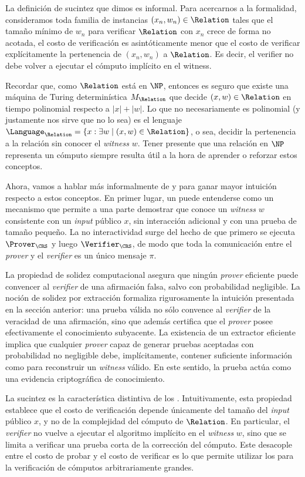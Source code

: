 La definición de sucintez que dimos es informal. Para acercarnos a la formalidad, consideramos toda familia de instancias $(x_n,w_n) \in \Relation$ tales que el tamaño mínimo de $w_n$ para verificar $\Relation$ con $x_n$ crece de forma no acotada, el costo de verificación es asintóticamente menor que el costo de verificar explícitamente la pertenencia de $(x_n, w_n)$ a $\Relation$. Es decir, el verifier no debe volver a ejecutar el cómputo implícito en el witness.

Recordar que, como $\Relation$ está en $\NP$, entonces es seguro que existe una máquina de Turing determinística $M_\Relation$ que decide $(x,w) \in \Relation$ en tiempo polinomial respecto a $|x| + |w|$. Lo que no necesariamente es polinomial (y justamente nos sirve que no lo sea) es el lenguaje $\Language_\Relation = \{x: \exists w \mid (x,w) \in \Relation\}$, o sea, decidir la pertenencia a la relación sin conocer el \textit{witness} $w$. Tener presente que una relación en $\NP$ representa un cómputo siempre resulta útil a la hora de aprender o reforzar estos conceptos.

Ahora, vamos a hablar más informalmente de \SNARK y \zkSNARK para ganar mayor intuición respecto a estos conceptos. En primer lugar, un \SNARK puede entenderse como un mecanismo que permite a una parte demostrar que conoce un \textit{witness} $w$ consistente con un \textit{input} público $x$, sin interacción adicional y con una prueba de tamaño pequeño. La no interactividad surge del hecho de que primero se ejecuta $\Prover_\CRS$ y luego $\Verifier_\CRS$, de modo que toda la comunicación entre el \textit{prover} y el \textit{verifier} es un único mensaje $\pi$.

La propiedad de solidez computacional asegura que ningún \textit{prover} eficiente puede convencer al \textit{verifier} de una afirmación falsa, salvo con probabilidad negligible. La noción de solidez por extracción formaliza rigurosamente la intuición presentada en la sección anterior: una prueba válida no sólo convence al \textit{verifier} de la veracidad de una afirmación, sino que además certifica que el \textit{prover} posee efectivamente el conocimiento subyacente. La existencia de un extractor eficiente implica que cualquier \textit{prover} capaz de generar pruebas aceptadas con probabilidad no negligible debe, implícitamente, contener suficiente información como para reconstruir un \textit{witness} válido. En este sentido, la prueba actúa como una evidencia criptográfica de conocimiento.

La sucintez es la característica distintiva de los \SNARK. Intuitivamente, esta propiedad establece que el costo de verificación depende únicamente del tamaño del \textit{input} público $x$, y no de la complejidad del cómputo de $\Relation$. En particular, el \textit{verifier} no vuelve a ejecutar el algoritmo implícito en el \textit{witness} $w$, sino que se limita a verificar una prueba corta de la corrección del cómputo. Este desacople entre el costo de probar y el costo de verificar es lo que permite utilizar los \SNARK para la verificación de cómputos arbitrariamente grandes.

